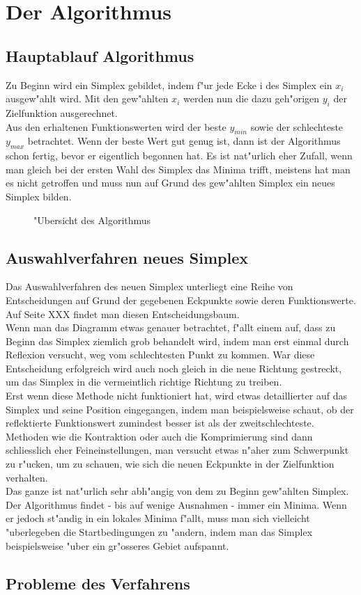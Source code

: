 \section{Der Algorithmus}

\subsection{Hauptablauf Algorithmus}
Zu Beginn wird ein Simplex gebildet, indem f"ur jede Ecke i des Simplex ein $x_i$ ausgew"ahlt wird. 
Mit den gew"ahlten $x_i$ werden nun die dazu geh"origen $y_i$ der Zielfunktion ausgerechnet. \\
Aus den erhaltenen Funktionswerten wird der beste $y_{min}$ sowie der schlechteste $y_{max}$ betrachtet. Wenn der beste Wert gut genug ist, dann ist der Algorithmus schon fertig, bevor er eigentlich begonnen hat. Es ist nat"urlich eher Zufall, wenn man gleich bei der ersten Wahl des Simplex das Minima trifft, meistens hat man es nicht getroffen und muss nun auf Grund des gew"ahlten Simplex ein neues Simplex bilden. 

\begin{figure}[h]

\caption{"Ubersicht des Algorithmus}
\label{fig:downhillalgo1}
\end{figure}

\subsection{Auswahlverfahren neues Simplex}
Das Auswahlverfahren des neuen Simplex unterliegt eine Reihe von Entscheidungen auf Grund der gegebenen Eckpunkte sowie deren Funktionswerte. Auf Seite XXX findet man diesen Entscheidungsbaum.\\
Wenn man das Diagramm etwas genauer betrachtet, f"allt einem auf, dass zu Beginn das Simplex ziemlich grob behandelt wird, indem man erst einmal durch Reflexion versucht, weg vom schlechtesten Punkt zu kommen. War diese Entscheidung erfolgreich wird auch noch gleich in die neue Richtung gestreckt, um das Simplex in die vermeintlich richtige Richtung zu treiben. \\
Erst wenn diese Methode nicht funktioniert hat, wird etwas detaillierter auf das Simplex und seine Position eingegangen, indem man beispielsweise schaut, ob der reflektierte Funktionswert zumindest besser ist als der zweitschlechteste. \\
Methoden wie die Kontraktion oder auch die Komprimierung sind dann schliesslich eher Feineinstellungen, man versucht etwas n"aher zum Schwerpunkt zu r"ucken, um zu schauen, wie sich die neuen Eckpunkte in der Zielfunktion verhalten.\\
Das ganze ist nat"urlich sehr abh"angig von dem zu Beginn gew"ahlten Simplex. Der Algorithmus findet - bis auf wenige Ausnahmen - immer ein Minima. Wenn er jedoch st"andig in ein lokales Minima f"allt, muss man sich vielleicht "uberlegeben die Startbedingungen zu "andern, indem man das Simplex beispielsweise "uber ein gr"osseres Gebiet aufspannt.\\


\subsection{Probleme des Verfahrens}
